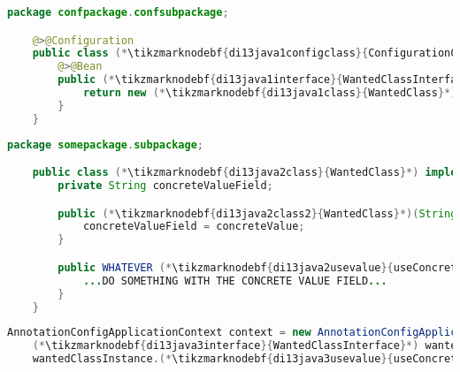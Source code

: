 \begin{lstlisting}[language=Java, title={Configuration class}]
    package confpackage.confsubpackage;

    @>@Configuration
    public class (*\tikzmarknodebf{di13java1configclass}{ConfigurationClass}*) {
        @>@Bean
        public (*\tikzmarknodebf{di13java1interface}{WantedClassInterface}*) (*\tikzmarknodebf{di13java1beanid}{wantedBeanMethod}*)() {
            return new (*\tikzmarknodebf{di13java1class}{WantedClass}*)("someValue");
        }
    }
\end{lstlisting}
\begin{lstlisting}[language=Java, title={Wanted class with the constructor}]
    package somepackage.subpackage;

    public class (*\tikzmarknodebf{di13java2class}{WantedClass}*) implements (*\tikzmarknodebf{di13java2interface}{WantedClassInterface}*) {
        private String concreteValueField;

        public (*\tikzmarknodebf{di13java2class2}{WantedClass}*)(String concreteValue) {
            concreteValueField = concreteValue;
        }

        public WHATEVER (*\tikzmarknodebf{di13java2usevalue}{useConcreteValue}*)() {
            ...DO SOMETHING WITH THE CONCRETE VALUE FIELD...
        }
    }
\end{lstlisting}
\begin{lstlisting}[language=Java, title={Usage}]
    AnnotationConfigApplicationContext context = new AnnotationConfigApplicationContext((*\tikzmarknodebf{di13java3configclass}{ConfigurationClass}*).class);
    (*\tikzmarknodebf{di13java3interface}{WantedClassInterface}*) wantedClassInstance = context.getBean("(*\tikzmarknodebf{di13java3beanid}{wantedBeanMethod}[ForestGreen]*)", (*\tikzmarknodebf{di13java3interface2}{WantedClassInterface}*).class);
    wantedClassInstance.(*\tikzmarknodebf{di13java3usevalue}{useConcreteValue}*)();
\end{lstlisting}
\newpage

